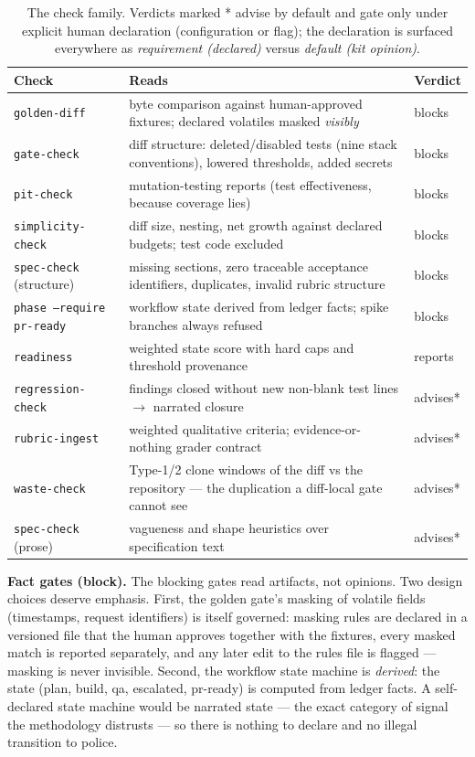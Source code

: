 \documentclass[11pt]{article}
\begin{document}
\begin{table}[t]
\centering
\small
\begin{tabular}{@{}lp{8.6cm}l@{}}
\toprule
\textbf{Check} & \textbf{Reads} & \textbf{Verdict} \\
\midrule
\texttt{golden-diff} & byte comparison against human-approved fixtures;
declared volatiles masked \emph{visibly} & blocks \\
\texttt{gate-check} & diff structure: deleted/disabled tests (nine stack
conventions), lowered thresholds, added secrets & blocks \\
\texttt{pit-check} & mutation-testing reports (test effectiveness, because
coverage lies) & blocks \\
\texttt{simplicity-check} & diff size, nesting, net growth against declared
budgets; test code excluded & blocks \\
\texttt{spec-check} (structure) & missing sections, zero traceable acceptance
identifiers, duplicates, invalid rubric structure & blocks \\
\texttt{phase --require pr-ready} & workflow state derived from ledger facts;
spike branches always refused & blocks \\
\texttt{readiness} & weighted state score with hard caps and threshold
provenance & reports \\
\texttt{regression-check} & findings closed without new non-blank test lines
$\rightarrow$ narrated closure & advises* \\
\texttt{rubric-ingest} & weighted qualitative criteria; evidence-or-nothing
grader contract & advises* \\
\texttt{waste-check} & Type-1/2 clone windows of the diff vs the repository ---
the duplication a diff-local gate cannot see & advises* \\
\texttt{spec-check} (prose) & vagueness and shape heuristics over
specification text & advises* \\
\bottomrule
\end{tabular}
\caption{The check family. Verdicts marked * advise by default and gate only
under explicit human declaration (configuration or flag); the declaration is
surfaced everywhere as \emph{requirement (declared)} versus \emph{default (kit
opinion)}.}
\label{tab:checks}
\end{table}

\textbf{Fact gates (block).} The blocking gates read artifacts, not opinions.
Two design choices deserve emphasis. First, the golden gate's masking of
volatile fields (timestamps, request identifiers) is itself governed: masking
rules are declared in a versioned file that the human approves together with
the fixtures, every masked match is reported separately, and any later edit to
the rules file is flagged --- masking is never invisible. Second, the workflow
state machine is \emph{derived}: the state (plan, build, qa, escalated,
pr-ready) is computed from ledger facts. A self-declared state machine would
be narrated state --- the exact category of signal the methodology distrusts
--- so there is nothing to declare and no illegal transition to police.
\end{document}
